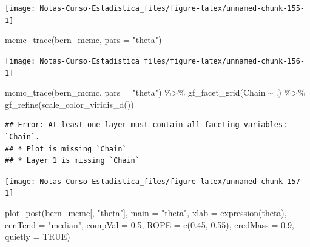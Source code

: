 \documentclass[
  12pt,
]{book}
\newenvironment{Shaded}{\begin{snugshade}}{\end{snugshade}}
\newcommand{\AttributeTok}[1]{\textcolor[rgb]{0.77,0.63,0.00}{#1}}
\newcommand{\ConstantTok}[1]{\textcolor[rgb]{0.00,0.00,0.00}{#1}}
\newcommand{\FloatTok}[1]{\textcolor[rgb]{0.00,0.00,0.81}{#1}}
\newcommand{\FunctionTok}[1]{\textcolor[rgb]{0.00,0.00,0.00}{#1}}
\newcommand{\NormalTok}[1]{#1}
\newcommand{\SpecialCharTok}[1]{\textcolor[rgb]{0.00,0.00,0.00}{#1}}
\newcommand{\StringTok}[1]{\textcolor[rgb]{0.31,0.60,0.02}{#1}}
\theoremstyle{definition}
\theoremstyle{definition}
\theoremstyle{definition}
\theoremstyle{remark}
\begin{document}
\begin{center}\texttt{[image: Notas-Curso-Estadistica\_files/figure-latex/unnamed-chunk-155-1]} \end{center}

\begin{Shaded}
\begin{Highlighting}[]
\FunctionTok{mcmc\_trace}\NormalTok{(bern\_mcmc, }\AttributeTok{pars =} \StringTok{"theta"}\NormalTok{)}
\end{Highlighting}
\end{Shaded}

\begin{center}\texttt{[image: Notas-Curso-Estadistica\_files/figure-latex/unnamed-chunk-156-1]} \end{center}

\begin{Shaded}
\begin{Highlighting}[]
\FunctionTok{mcmc\_trace}\NormalTok{(bern\_mcmc, }\AttributeTok{pars =} \StringTok{"theta"}\NormalTok{) }\SpecialCharTok{\%\textgreater{}\%} \FunctionTok{gf\_facet\_grid}\NormalTok{(Chain }\SpecialCharTok{\textasciitilde{}} 
\NormalTok{    .) }\SpecialCharTok{\%\textgreater{}\%} \FunctionTok{gf\_refine}\NormalTok{(}\FunctionTok{scale\_color\_viridis\_d}\NormalTok{())}
\end{Highlighting}
\end{Shaded}

\begin{verbatim}
## Error: At least one layer must contain all faceting variables: `Chain`.
## * Plot is missing `Chain`
## * Layer 1 is missing `Chain`
\end{verbatim}

\begin{center}\texttt{[image: Notas-Curso-Estadistica\_files/figure-latex/unnamed-chunk-157-1]} \end{center}

\begin{Shaded}
\begin{Highlighting}[]
\FunctionTok{plot\_post}\NormalTok{(bern\_mcmc[, }\StringTok{"theta"}\NormalTok{], }\AttributeTok{main =} \StringTok{"theta"}\NormalTok{, }\AttributeTok{xlab =} \FunctionTok{expression}\NormalTok{(theta), }
    \AttributeTok{cenTend =} \StringTok{"median"}\NormalTok{, }\AttributeTok{compVal =} \FloatTok{0.5}\NormalTok{, }\AttributeTok{ROPE =} \FunctionTok{c}\NormalTok{(}\FloatTok{0.45}\NormalTok{, }
        \FloatTok{0.55}\NormalTok{), }\AttributeTok{credMass =} \FloatTok{0.9}\NormalTok{, }\AttributeTok{quietly =} \ConstantTok{TRUE}\NormalTok{)}
\end{Highlighting}
\end{Shaded}
\end{document}
